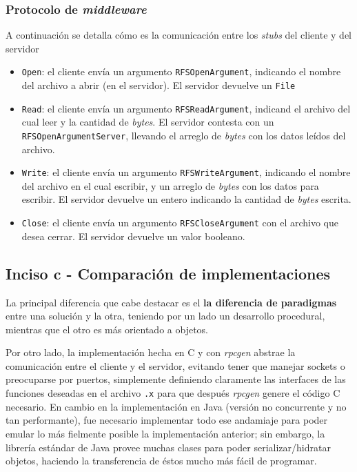 \subsubsection{Protocolo de \emph{middleware}}

A continuación se detalla cómo es la comunicación entre los \emph{stubs} del cliente y del servidor 

\begin{itemize}
    \item \texttt{Open}: el cliente envía un argumento \texttt{RFSOpenArgument}, indicando el nombre del archivo a abrir (en el servidor). El servidor devuelve un \texttt{File}   
    \item \texttt{Read}: el cliente envía un argumento \texttt{RFSReadArgument}, indicand el archivo del cual leer y la cantidad de \emph{bytes}. El servidor contesta con un \texttt{RFSOpenArgumentServer}, llevando el arreglo de \emph{bytes} con los datos leídos del archivo.
    \item \texttt{Write}: el cliente envía un argumento \texttt{RFSWriteArgument}, indicando el nombre del archivo en el cual escribir, y un arreglo de \emph{bytes} con los datos para escribir. El servidor devuelve un entero indicando la cantidad de \emph{bytes} escrita.
    \item \texttt{Close}: el cliente envía un argumento \texttt{RFSCloseArgument} con el archivo que desea cerrar. El servidor devuelve un valor booleano. 
\end{itemize}



\subsection{Inciso c - Comparación de implementaciones}

La principal diferencia que cabe destacar es el \textbf{la diferencia de paradigmas} entre una solución y la otra, teniendo por un lado un desarrollo procedural, mientras que el otro es más orientado a objetos.  

Por otro lado, la implementación hecha en C y con \emph{rpcgen} abstrae la comunicación entre el cliente y el servidor, evitando tener que manejar sockets o preocuparse por puertos, simplemente definiendo claramente las interfaces de las funciones deseadas en el archivo \texttt{.x} para que después \emph{rpcgen} genere el código C necesario. En cambio en la implementación en Java (versión no concurrente y no tan performante), fue necesario implementar todo ese andamiaje para poder emular lo más fielmente posible la implementación anterior; sin embargo, la librería estándar de Java provee muchas clases para poder serializar/hidratar objetos, haciendo la transferencia de éstos mucho más fácil de programar.

